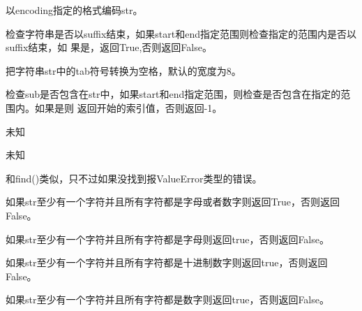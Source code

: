 \par{以encoding指定的格式编码str。}\\

\noindent{\color{red}{str.endswith(suffix[, start[, end]]):}}
\par{检查字符串是否以suffix结束，如果start和end指定范围则检查指定的范围内是否以suffix结束，如
果是，返回True,否则返回False。}\\

\noindent{\color{red}{str.expandtabs(tabsize=8):}}
\par{把字符串str中的tab符号转换为空格，默认的宽度为8。}\\

\noindent{\color{red}{str.find(sub[, start[, end]]):}}
\par{检查sub是否包含在str中，如果start和end指定范围，则检查是否包含在指定的范围内。如果是则
返回开始的索引值，否则返回-1。}\\

\noindent{\color{red}{str.format(*args, **kwargs):}}
\par{未知}\\

\noindent{\color{red}{str.format\_map(mapping):}}
\par{未知}\\

\noindent{\color{red}{str.index(sub[, start[, end]]):}}
\par{和find()类似，只不过如果没找到报ValueError类型的错误。}\\

\noindent{\color{red}{str.isalnum():}}
\par{如果str至少有一个字符并且所有字符都是字母或者数字则返回True，否则返回False。}\\

\noindent{\color{red}{str.isalpha():}}
\par{如果str至少有一个字符并且所有字符都是字母则返回true，否则返回False。}\\

\noindent{\color{red}{str.isdecimal():}}
\par{如果str至少有一个字符并且所有字符都是十进制数字则返回true，否则返回False。}\\

\noindent{\color{red}{str.isdigit():}}
\par{如果str至少有一个字符并且所有字符都是数字则返回true，否则返回False。}\\

